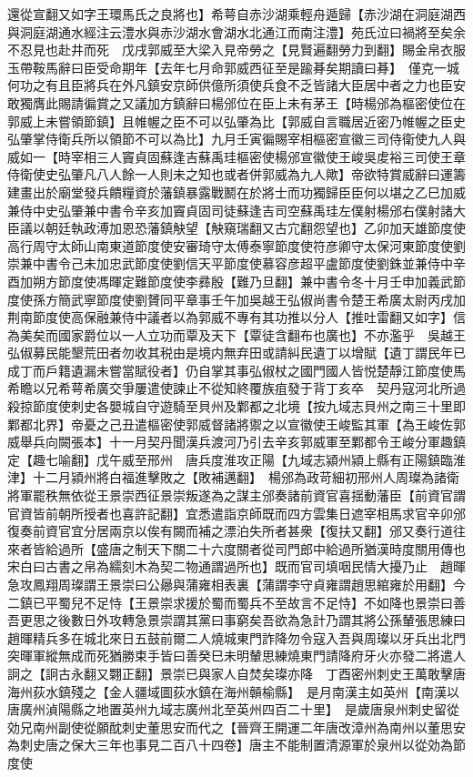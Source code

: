 還從宣翻又如字王環馬氏之良將也】希萼自赤沙湖乘輕舟遁歸【赤沙湖在洞庭湖西與洞庭湖通水經注云澧水與赤沙湖水會湖水北通江而南注澧】苑氏泣曰禍將至矣余不忍見也赴井而死　戊戌郭威至大梁入見帝勞之【見賢遍翻勞力到翻】賜金帛衣服玉帶鞍馬辭曰臣受命期年【去年七月命郭威西征至是踰朞矣期讀曰朞】　僅克一城何功之有且臣將兵在外凡鎮安京師供億所須使兵食不乏皆諸大臣居中者之力也臣安敢獨膺此賜請徧賞之又議加方鎮辭曰楊邠位在臣上未有茅王【時楊邠為樞密使位在郭威上未嘗領節鎮】且帷幄之臣不可以弘肇為比【郭威自言職居近密乃帷幄之臣史弘肇掌侍衛兵所以領節不可以為比】九月壬寅徧賜宰相樞密宣徽三司侍衛使九人與威如一【時宰相三人竇貞固蘇逢吉蘇禹珪樞密使楊邠宣徽使王峻吳䖍裕三司使王章侍衛使史弘肇凡八人餘一人則未之知也或者併郭威為九人歟】帝欲特賞威辭曰運籌建畫出於廟堂發兵饋糧資於藩鎮暴露戰鬭在於將士而功獨歸臣臣何以堪之乙巳加威兼侍中史弘肇兼中書令辛亥加竇貞固司徒蘇逢吉司空蘇禹珪左僕射楊邠右僕射諸大臣議以朝廷執政溥加恩恐藩鎮觖望【觖窺瑞翻又古宂翻怨望也】乙卯加天雄節度使高行周守太師山南東道節度使安審琦守太傅泰寧節度使符彦卿守太保河東節度使劉崇兼中書令己未加忠武節度使劉信天平節度使慕容彦超平盧節度使劉銖並兼侍中辛酉加朔方節度使馮暉定難節度使李彞殷【難乃旦翻】兼中書令冬十月壬申加義武節度使孫方簡武寧節度使劉贇同平章事壬午加吳越王弘俶尚書令楚王希廣太尉丙戌加荆南節度使高保融兼侍中議者以為郭威不專有其功推以分人【推吐雷翻又如字】信為美矣而國家爵位以一人立功而覃及天下【覃徒含翻布也廣也】不亦濫乎　吳越王弘俶募民能墾荒田者勿收其税由是境内無弃田或請糾民遺丁以增賦【遺丁謂民年已成丁而戶籍遺漏未嘗當賦役者】仍自掌其事弘俶杖之國門國人皆悦楚靜江節度使馬希瞻以兄希萼希廣交爭屢遣使諫止不從知終覆族疽發于背丁亥卒　契丹寇河北所過殺掠節度使刺史各嬰城自守遊騎至貝州及鄴都之北境【按九域志貝州之南三十里即鄴都北界】帝憂之己丑遣樞密使郭威督諸將禦之以宣徽使王峻監其軍【為王峻佐郭威舉兵向闕張本】十一月契丹聞漢兵渡河乃引去辛亥郭威軍至鄴都令王峻分軍趣鎮定【趣七喻翻】戊午威至邢州　唐兵度淮攻正陽【九域志潁州潁上縣有正陽鎮臨淮津】十二月潁州將白福進擊敗之【敗補邁翻】　楊邠為政苛細初邢州人周璨為諸衛將軍罷秩無依從王景崇西征景崇叛遂為之謀主邠奏諸前資官喜揺動藩臣【前資官謂官資皆前朝所授者也喜許記翻】宜悉遣詣京師既而四方雲集日遮宰相馬求官辛卯邠復奏前資官宜分居兩京以俟有闕而補之漂泊失所者甚衆【復扶又翻】邠又奏行道往來者皆給過所【盛唐之制天下關二十六度關者從司門郎中給過所猶漢時度關用傳也宋白曰古書之帛為繻刻木為契二物通謂過所也】既而官司填咽民情大擾乃止　趙暉急攻鳳翔周璨謂王景崇曰公曏與蒲雍相表裏【蒲謂李守貞雍謂趙思綰雍於用翻】今二鎮已平蜀兒不足恃【王景崇求援於蜀而蜀兵不至故言不足恃】不如降也景崇曰善吾更思之後數日外攻轉急景崇謂其黨曰事窮矣吾欲為急計乃謂其將公孫輦張思練曰趙暉精兵多在城北來日五鼓前爾二人燒城東門詐降勿令寇入吾與周璨以牙兵出北門突暉軍縱無成而死猶勝束手皆曰善癸巳未明輦思練燒東門請降府牙火亦發二將遣人詗之【詗古永翻又翾正翻】景崇已與家人自焚矣璨亦降　丁酉密州刺史王萬敢擊唐海州荻水鎮殘之【金人疆域圖荻水鎮在海州贑榆縣】　是月南漢主如英州【南漢以唐廣州湞陽縣之地置英州九域志廣州北至英州四百二十里】　是歲唐泉州刺史留從効兄南州副使從願酖刺史董思安而代之【晉齊王開運二年唐改漳州為南州以董思安為刺史唐之保大三年也事見二百八十四卷】唐主不能制置清源軍於泉州以從効為節度使

